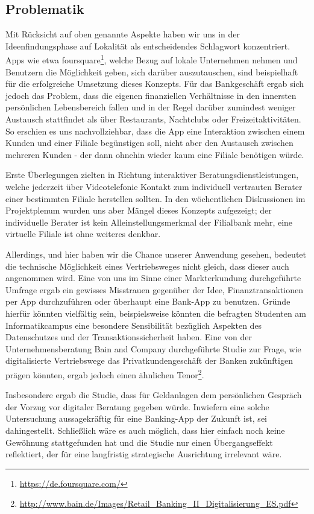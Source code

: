 
\subsection{Problematik}
Mit Rücksicht auf oben genannte Aspekte haben wir uns in der Ideenfindungsphase auf Lokalität als entscheidendes Schlagwort konzentriert. Apps wie etwa foursquare\footnote{\url{https://de.foursquare.com/}}, welche Bezug auf lokale Unternehmen nehmen und Benutzern die Möglichkeit geben, sich darüber auszutauschen, sind beispielhaft für die erfolgreiche Umsetzung dieses Konzepts. Für das Bankgeschäft ergab sich jedoch das Problem, dass die eigenen finanziellen Verhältnisse in den innersten persönlichen Lebensbereich fallen und in der Regel darüber zumindest weniger Austausch stattfindet als über Restaurants, Nachtclubs oder Freizeitaktivitäten. So erschien es uns nachvollziehbar, dass die App eine Interaktion zwischen einem Kunden und einer Filiale begünstigen soll, nicht aber den Austausch zwischen mehreren Kunden - der dann ohnehin wieder kaum eine Filiale benötigen würde.

Erste Überlegungen zielten in Richtung interaktiver Beratungsdienstleistungen, welche jederzeit über Videotelefonie Kontakt zum individuell vertrauten Berater einer bestimmten Filiale herstellen sollten. In den wöchentlichen Diskussionen im Projektplenum wurden uns aber Mängel dieses Konzepts aufgezeigt; der individuelle Berater ist kein Alleinstellungsmerkmal der Filialbank mehr, eine virtuelle Filiale ist ohne weiteres denkbar.

Allerdings, und hier haben wir die Chance unserer Anwendung gesehen, bedeutet die technische Möglichkeit eines Vertriebsweges nicht gleich, dass dieser auch angenommen wird. Eine von uns im Sinne einer Markterkundung durchgeführte Umfrage ergab ein gewisses Misstrauen gegenüber der Idee, Finanztransaktionen per App durchzuführen oder  überhaupt eine Bank-App zu benutzen. Gründe hierfür könnten vielfältig sein, beispielsweise könnten die befragten Studenten am Informatikcampus eine besondere Sensibilität bezüglich Aspekten des Datenschutzes und der Transaktionssicherheit haben. Eine von der Unternehmensberatung Bain and Company durchgeführte Studie zur Frage, wie digitalisierte Vertriebswege das Privatkundengeschäft der Banken zukünftigen prägen könnten, ergab jedoch einen ähnlichen Tenor\footnote{\url{http://www.bain.de/Images/Retail\_Banking\_II\_Digitalisierung\_ES.pdf}}.

 Insbesondere ergab die Studie, dass für Geldanlagen dem persönlichen Gespräch der Vorzug vor digitaler Beratung gegeben würde. Inwiefern eine solche Untersuchung aussagekräftig für eine Banking-App der Zukunft ist, sei dahingestellt. Schließlich wäre es auch möglich, dass hier einfach noch keine Gewöhnung stattgefunden hat und die Studie nur einen Übergangseffekt reflektiert, der für eine langfristig strategische Ausrichtung irrelevant wäre. 
 
